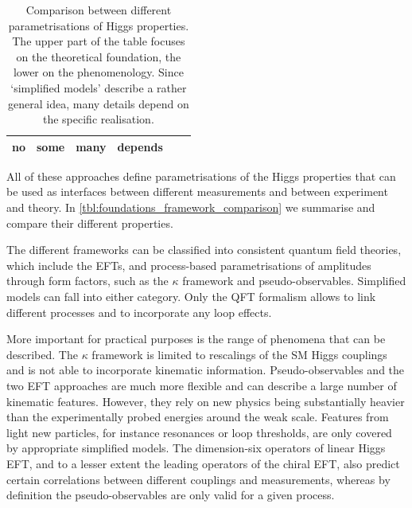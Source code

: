 \begin{table}
\begin{tabularx}{\textwidth}{LLLLLL}
    no &
    some & 
    many &
    depends \\
    \bottomrule
  \end{tabularx}
  \caption[Comparison between different parametrisations of Higgs properties]{Comparison
    between different parametrisations of Higgs properties. The upper part of the table
    focuses on the theoretical foundation, the lower on the phenomenology.
    Since `simplified models' describe a rather general idea, many
    details depend on the specific realisation.}
  \label{tbl:foundations_framework_comparison}
\end{table}

All of these approaches define parametrisations of the Higgs properties
that can be used as interfaces between different measurements and
between experiment and theory. In
\autoref{tbl:foundations_framework_comparison} we summarise and
compare their different properties.

The different frameworks can be classified into consistent quantum
field theories, which include the EFTs, and process-based
parametrisations of amplitudes through form factors, such as the
$\kappa$ framework and pseudo-observables. Simplified models can fall
into either category. Only the QFT formalism allows to link different
processes and to incorporate any loop effects.

More important for practical purposes is the range of phenomena that
can be described. The $\kappa$ framework is limited to rescalings of
the SM Higgs couplings and is not able to incorporate kinematic
information. Pseudo-observables and the two EFT approaches are much
more flexible and can describe a large number of kinematic
features. However, they rely on new physics being substantially
heavier than the experimentally probed energies around the weak
scale. Features from light new particles, for instance resonances or
loop thresholds, are only covered by appropriate simplified
models. The dimension-six operators of linear Higgs EFT, and to a
lesser extent the leading operators of the chiral EFT, also predict
certain correlations between different couplings and measurements,
whereas by definition the pseudo-observables are only valid for a given
process.


